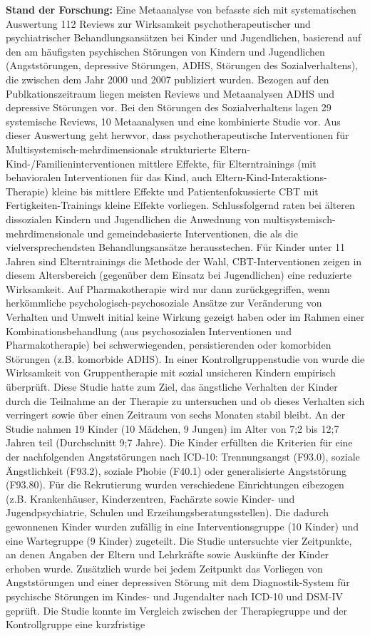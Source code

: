 \textbf{Stand der Forschung:} Eine Metaanalyse von  befasste sich mit systematischen Auswertung 112 Reviews zur Wirksamkeit psychotherapeutischer und psychiatrischer Behandlungsansätzen bei Kinder und Jugendlichen,
basierend auf den am häufigsten psychischen Störungen von Kindern und Jugendlichen (Angststörungen, depressive Störungen,
ADHS, Störungen des Sozialverhaltens), die zwischen dem Jahr 2000 und 2007 publiziert wurden. Bezogen auf den Publkationszeitraum liegen meisten Reviews und Metaanalysen ADHS und depressive Störungen vor. Bei den Störungen des Sozialverhaltens lagen 29 systemische Reviews, 10 Metaanalysen und eine kombinierte Studie vor. Aus dieser Auswertung geht herwvor, dass psychotherapeutische Interventionen für Multisystemisch-mehrdimensionale strukturierte Eltern-Kind-/Familieninterventionen mittlere Effekte, für Elterntrainings (mit behavioralen Interventionen für das Kind, auch Eltern-Kind-Interaktions-Therapie) kleine bis mittlere Effekte und Patientenfokussierte CBT mit Fertigkeiten-Trainings kleine Effekte vorliegen. Schlussfolgernd raten  bei älteren dissozialen Kindern und Jugendlichen die Anwednung von multisystemisch-mehrdimensionale und gemeindebasierte Interventionen, die als die vielversprechendsten Behandlungsansätze herausstechen. Für Kinder unter 11 Jahren sind Elterntrainings die Methode der Wahl, CBT-Interventionen zeigen in diesem Altersbereich (gegenüber dem Einsatz bei Jugendlichen) eine reduzierte Wirksamkeit. Auf Pharmakotherapie wird nur dann zurückgegriffen, wenn herkömmliche psychologisch-psychosoziale Ansätze zur Veränderung von Verhalten und Umwelt initial keine Wirkung gezeigt haben oder im Rahmen einer Kombinationsbehandlung (aus psychosozialen Interventionen und Pharmakotherapie) bei schwerwiegenden, persistierenden oder komorbiden Störungen (z.B. komorbide ADHS). In einer Kontrollgruppenstudie von  wurde die Wirksamkeit von Gruppentherapie mit sozial unsicheren Kindern empirisch überprüft. Diese Studie hatte zum Ziel, das ängstliche Verhalten der Kinder durch die Teilnahme an der Therapie zu untersuchen und ob dieses Verhalten sich verringert sowie über einen Zeitraum von sechs Monaten stabil bleibt. An der Studie nahmen 19 Kinder (10 Mädchen, 9 Jungen) im Alter von 7;2 bis 12;7 Jahren teil (Durchschnitt 9;7 Jahre). Die Kinder erfüllten die Kriterien für eine der nachfolgenden Angststörungen nach ICD-10: Trennungsangst (F93.0), soziale Ängstlichkeit (F93.2), soziale Phobie (F40.1) oder generalisierte Angststörung (F93.80). Für die Rekrutierung wurden verschiedene Einrichtungen eibezogen (z.B. Krankenhäuser, Kinderzentren, Fachärzte sowie Kinder- und Jugendpsychiatrie, Schulen und Erzeihungsberatungsstellen). Die dadurch gewonnenen Kinder wurden zufällig in eine Interventionsgruppe (10 Kinder) und eine Wartegruppe (9 Kinder) zugeteilt. Die Studie untersuchte vier Zeitpunkte, an denen Angaben der Eltern und Lehrkräfte sowie Auskünfte der Kinder erhoben wurde. Zusätzlich wurde bei jedem Zeitpunkt das Vorliegen von Angststörungen und einer depressiven Störung mit dem Diagnostik-System für psychische Störungen im Kindes- und Jugendalter nach ICD-10 und DSM-IV geprüft. Die Studie konnte im Vergleich zwischen der Therapiegruppe und der Kontrollgruppe eine kurzfristige 
